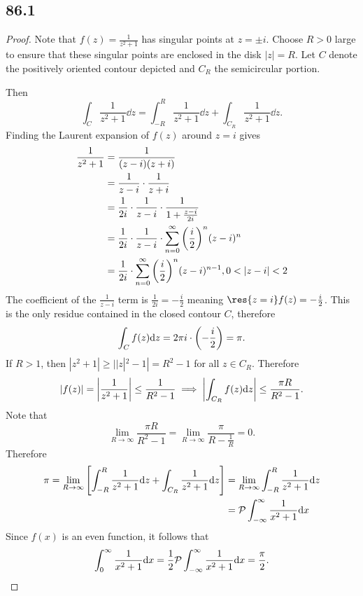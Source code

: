 \documentclass[12pt]{extarticle}
\begin{document}
\subsection*{86.1}
\begin{proof}
    Note that $f(z) = \frac{1}{z^2 + 1}$ has singular points at $z = \pm i$. Choose $R > 0$ large to ensure that these singular points are enclosed in the disk $|z| = R$. Let $C$ denote the positively oriented contour depicted and $C_R$ the semicircular portion.
    \begin{center}
    \end{center}
    Then
    \[
        \int_{C} \frac{1}{z^2+1} \dd z = \int_{-R}^R \frac{1}{z^2 + 1} \dd z + \int_{C_R} \frac{1}{z^2 + 1} \dd z
    .\]
    Finding the Laurent expansion of $f(z)$ around $z = i$ gives
    \begin{align*}
        \frac{1}{z^2+1} &= \frac{1}{(z-i)(z+i)} \\
        &= \frac{1}{z-i} \cdot \frac{1}{z+i} \\
        &= \frac{1}{2i} \cdot \frac{1}{z-i} \cdot \frac{1}{1 + \frac{z-i}{2i}} \\
        &= \frac{1}{2i} \cdot \frac{1}{z-i} \cdot \sum_{n=0}^\infty \qty(\frac{i}{2})^n (z-i)^n \\
        &= \frac{1}{2i} \cdot \sum_{n=0}^\infty \qty(\frac{i}{2})^n (z-i)^{n-1}, 0 < |z-i| < 2
    \end{align*}
    The coefficient of the $\frac{1}{z-i}$ term is $\frac{1}{2i} = -\frac{i}{2}$ meaning $\res{z=i} f(z) = -\frac{i}{2}$. This is the only residue contained in the closed contour $C$, therefore
    \[
        \int_C f(z) \dd z = 2 \pi i \cdot \qty(-\frac{i}{2}) = \pi
    .\]
    If $R > 1$, then $|z^2 + 1| \geq ||z|^2 - 1| = R^2 - 1$ for all $z \in C_R$. Therefore
    \[
        |f(z)| = \qty|\frac{1}{z^2+1}| \leq \frac{1}{R^2 - 1} \implies \qty|\int_{C_R} f(z) \dd z| \leq \frac{\pi R}{R^2 - 1}
    .\]
    Note that
    \[
        \lim_{R \to \infty} \frac{\pi R}{R^2 - 1} = \lim_{R\to \infty} \frac{\pi}{R - \frac{1}{R}} = 0
    .\]
    Therefore
    \begin{align*}
        \pi = \lim_{R \to \infty} \qty[
        \int_{-R}^R \frac{1}{z^2+1} \dd z + \int_{C_R} \frac{1}{z^2+1} \dd z
        ] &= \lim_{R \to \infty} \int_{-R}^R \frac{1}{z^2+1} \dd z \\ 
          &= \pv \int_{-\infty}^\infty \frac{1}{x^2+1} \dd x
    \end{align*}
    Since $f(x)$ is an even function, it follows that
    \[
        \int_0^\infty \frac{1}{x^2 + 1} \dd x = \frac{1}{2} \pv \int_{-\infty}^\infty \frac{1}{x^2+1} \dd x = \frac{\pi}{2}
    .\qedhere\]
\end{proof}
\end{document}
